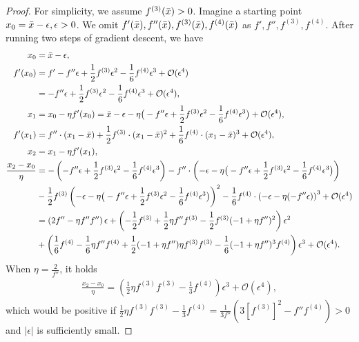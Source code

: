 \documentclass{article}
\theoremstyle{plain}
\theoremstyle{remark}
\newcommand{\T}[1]{^{(#1)}}
\def\O{\mathcal{O}}
\begin{document}
\begin{proof}
For simplicity, we assume $f\T{3}(\Bar{x})>0$. 
Imagine a starting point $x_0=\Bar{x}-\epsilon, \epsilon>0$. We omit $f'(\Bar{x}),f''(\Bar{x}),f\T{3}(\Bar{x}), f\T{4}(\Bar{x})$ as $f',f'',f\T{3},f\T{4}$. After running two steps of gradient descent, we have
\begin{align*}
    x_0 &= \Bar{x} - \epsilon,\\
    f'(x_0) &= f' - f''\epsilon + \frac{1}{2}f\T{3}\epsilon^2 - \frac{1}{6}f\T{4}\epsilon^3 +\O(\epsilon^4) \\
    &= - f''\epsilon + \frac{1}{2}f\T{3}\epsilon^2 - \frac{1}{6}f\T{4}\epsilon^3 +\O(\epsilon^4), \\
    x_1 &= x_0 - \eta f'(x_0) = \Bar{x} - \epsilon - \eta\big(-f''\epsilon + \frac{1}{2}f\T{3}\epsilon^2- \frac{1}{6}f\T{4}\epsilon^3\big)+\O(\epsilon^4),\\
    f'(x_1) &= f''\cdot(x_1-\Bar{x})+\frac{1}{2}f\T{3}\cdot(x_1-\Bar{x})^2+\frac{1}{6}f\T{4}\cdot(x_1-\Bar{x})^3+\O(\epsilon^4),\\
    x_2 &= x_1 - \eta f'(x_1),\\
    \frac{x_2-x_0}{\eta} &= - \left(-f''\epsilon + \frac{1}{2}f\T{3}\epsilon^2- \frac{1}{6}f\T{4}\epsilon^3\right)-f''\cdot\left(- \epsilon - \eta\big(-f''\epsilon + \frac{1}{2}f\T{3}\epsilon^2- \frac{1}{6}f\T{4}\epsilon^3\big)\right) \\
    & -\frac{1}{2} f\T{3}\left(- \epsilon - \eta\big(-f''\epsilon + \frac{1}{2}f\T{3}\epsilon^2- \frac{1}{6}f\T{4}\epsilon^3\big)\right)^2
    -\frac{1}{6} f\T{4}\cdot\left(-\epsilon-\eta(-f''\epsilon)\right)^3 +\O(\epsilon^4)\\
    &=\left(2 f'' -\eta f'' f''\right)\epsilon + \left(-\frac{1}{2}f\T{3}+\frac{1}{2}\eta f''f\T{3}-\frac{1}{2}f\T{3}(-1+\eta f'')^2\right)\epsilon^2 \\
    &+\left(\frac{1}{6}f\T{4}-\frac{1}{6}\eta f''f\T{4}+\frac{1}{2}(-1+\eta f'')\eta f\T{3}f\T{3}-\frac{1}{6}(-1+\eta f'')^3 f\T{4}\right)\epsilon^3+\O(\epsilon^4).
\end{align*}
When $\eta=\frac{2}{f''}$, it holds
\begin{align}
    \frac{x_2-x_0}{\eta}= \left(\frac{1}{2}\eta f\T{3}f\T{3}-\frac{1}{3}f\T{4}\right)\epsilon^3 + \O(\epsilon^4), \label{eq:temp3}
\end{align}
which would be positive if $\frac{1}{2}\eta f\T{3}f\T{3}-\frac{1}{3}f\T{4}=\frac{1}{3f''}(3[f\T{3}]^2-f'' f\T{4})>0$ and $|\epsilon|$ is sufficiently small.


\end{proof}
\end{document}
